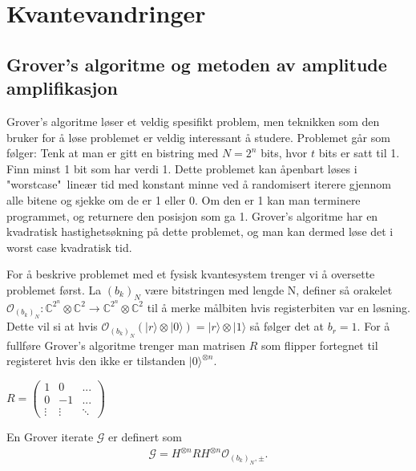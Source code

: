 \section{Kvantevandringer}

\subsection{Grover's algoritme og metoden av amplitude amplifikasjon}

    Grover's algoritme løser et veldig spesifikt problem, men teknikken som den bruker for å løse problemet er veldig interessant å studere. Problemet går som følger: Tenk at man er gitt en bistring med $N=2^n$ bits, hvor $t$ bits er satt til 1. Finn minst 1 bit som har verdi 1. Dette problemet kan åpenbart løses i "worstcase"\ lineær tid med konstant minne ved å randomisert iterere gjennom alle bitene og sjekke om de er 1 eller 0. Om den er 1 kan man terminere programmet, og returnere den posisjon som ga 1. Grover's algoritme har en kvadratisk hastighetsøkning på dette problemet, og man kan dermed løse det i worst case kvadratisk tid.

    For å beskrive problemet med et fysisk kvantesystem trenger vi å oversette problemet først. La $(b_k)_N$ være bitstringen med lengde N, definer så orakelet $\mathcal{O}_{(b_k)_N}:\mathbb{C}^{2^n} \otimes \mathbb{C}^2 \rightarrow \mathbb{C}^{2^n} \otimes \mathbb{C}^2$ til å merke målbiten hvis registerbiten var en løsning. Dette vil si at hvis $\mathcal{O}_{(b_k)_N}(|r\rangle\otimes |0\rangle) = |r\rangle\otimes |1\rangle$ så følger det at $b_r = 1$. For å fullføre Grover's algoritme trenger man matrisen $R$ som flipper fortegnet til registeret hvis den ikke er tilstanden $|0\rangle^{\otimes n}$.
    \begin{center}
        \begin{math}
            R = \begin{pmatrix}
                1 & 0 & ... \\
                0 & -1 & ... \\
                \vdots & \vdots & \ddots
            \end{pmatrix}
        \end{math}
    \end{center}

    En Grover iterate $\mathcal{G}$ er definert som 
    \begin{align*}
        \mathcal{G}=H^{\otimes n}RH^{\otimes n}\mathcal{O}_{(b_k)_N, \pm}.
    \end{align*}
    
